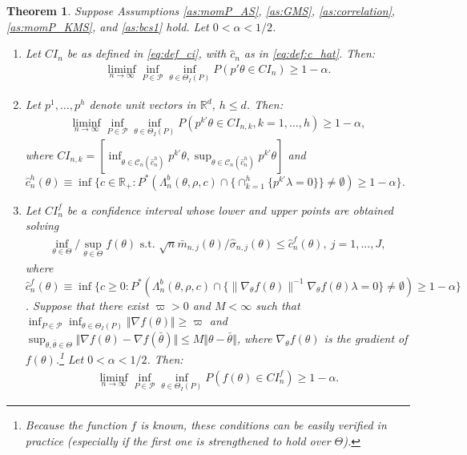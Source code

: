 \documentclass[letterpaper,11pt]{article}
\theoremstyle{myplain}
\newtheorem{theorem}{Theorem}[section]
\theoremstyle{mydefinition}
\theoremstyle{myremark}
\newcommand{\R}{\mathbb{R}}
\numberwithin{equation}{section}
\numberwithin{figure}{section}
\begin{document}
\begin{theorem}\label{thm:validity}
Suppose Assumptions \ref{as:momP_AS}, \ref{as:GMS}, \ref{as:correlation}, \ref{as:momP_KMS}, and \ref{as:bcs1} hold. Let $0<\alpha < 1/2$.
\begin{enumerate}[label=(\Roman*)]
\item \label{thm:validity:basic} Let $CI_n$ be as defined in \eqref{eq:def_ci}, with $\hat{c}_n$ as in \eqref{eq:def:c_hat}. Then:
\begin{align}
\liminf_{n\to\infty}\inf_{P\in\mathcal P}\inf_{\theta\in\Theta_I(P)}P(p'\theta\in CI_n)\ge 1-\alpha.\label{eq:coverage_control}
\end{align}
\item \label{cor:thm:validity} Let $p^1,\dots,p^h$ denote unit vectors in $\R^d$, $h \le d$. Then:\begin{align}
\liminf_{n\to\infty}\inf_{P\in\mathcal P}\inf_{\theta\in\Theta_I(P)}P(p^{k \prime}\theta \in CI_{n,k},k=1,\dots,h)\ge 1-\alpha,
\end{align}
where $CI_{n,k}=\left[\inf_{\theta\in\mathcal C_n(\hat{c}^h_n)} p^{k \prime}\theta, \sup_{\theta\in\mathcal C_n(\hat{c}^h_n)} p^{k \prime }\theta \right]$ and $\hat c^h_n(\theta)\equiv \inf\{c\in\mathbb R_+:P^*(\Lambda_n^b (\theta ,\rho ,c)\cap \{\cap_{k=1}^h\{p^{k \prime }\lambda =0\}\}\neq \emptyset)\ge 1-\alpha\}$.
\item \label{thm:nonlinear}	 Let $CI_n^f$ be a confidence interval whose lower and upper points are obtained solving
\begin{align*}
\inf_{\theta \in \Theta} / \sup_{\theta \in \Theta} f(\theta) \text{  s.t. }\sqrt{n}\bar{m}_{n,j}(\theta )/\hat{\sigma}_{n,j}(\theta )\leq
\hat{c}^f_n(\theta),~j=1,... ,J,
\end{align*}
where $\hat c^f_n(\theta)\equiv \inf\{c \geq 0:P^*(\Lambda_n^b (\theta ,\rho ,c)\cap \{\|\nabla_\theta f(\theta )\|^{-1}\nabla_\theta f(\theta )\lambda =0\}\neq \emptyset)\ge 1-\alpha\}$.
Suppose that there exist $\varpi>0$ and $M<\infty$ such that $\inf_{P\in\mathcal P}\inf_{\theta\in\Theta_I(P)}\Vert \nabla f(\theta)\Vert\ge \varpi$ and $\sup_{\theta,\bar{\theta}\in\Theta}\Vert \nabla f(\theta)-\nabla f(\bar{\theta})\Vert\le M \Vert \theta -\bar{\theta} \Vert$, where $\nabla_\theta f(\theta)$ is the gradient of $f(\theta)$.\footnote{Because the function $f$ is known, these conditions can be easily verified in practice (especially if the first one is strengthened to hold over $\Theta$).} Let $0<\alpha < 1/2$. Then:
\begin{align}
\liminf_{n\to\infty}\inf_{P\in\mathcal P}\inf_{\theta\in\Theta_I(P)}P(f(\theta)\in CI_n^f)\ge 1-\alpha.
\end{align}
\end{enumerate}
\end{theorem}
\end{document}
